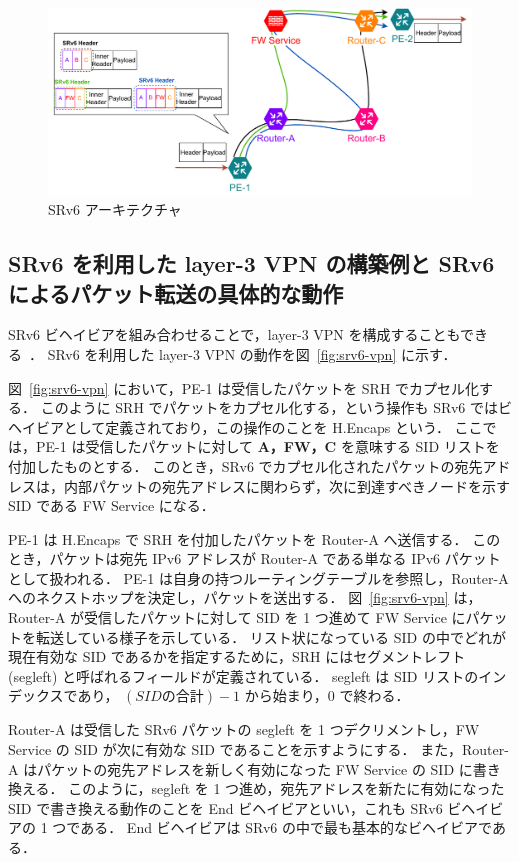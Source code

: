 \begin{figure}[t]
    \centering
    \includegraphics[width=0.95\linewidth]{img/SRv6Arch.pdf}
    \caption{SRv6 アーキテクチャ}
    \label{fig:srv6}
\end{figure}

\subsection{SRv6 を利用した layer-3 VPN の構築例と SRv6 によるパケット転送の具体的な動作}
\label{sbsection:srv6-vpn}

SRv6 ビヘイビアを組み合わせることで，layer-3 VPN を構成することもできる~\cite{rfc9252}．
SRv6 を利用した layer-3 VPN の動作を図~\ref*{fig:srv6-vpn} に示す．

図~\ref*{fig:srv6-vpn}  において，PE-1 は受信したパケットを SRH でカプセル化する．
このように SRH でパケットをカプセル化する，という操作も SRv6 ではビヘイビアとして定義されており，この操作のことを H.Encaps という．
ここでは，PE-1 は受信したパケットに対して \textbf{A，FW，C} を意味する SID リストを付加したものとする．
このとき，SRv6 でカプセル化されたパケットの宛先アドレスは，内部パケットの宛先アドレスに関わらず，次に到達すべきノードを示す SID である FW Service になる．

PE-1 は H.Encaps で SRH を付加したパケットを Router-A へ送信する．
このとき，パケットは宛先 IPv6 アドレスが Router-A である単なる IPv6 パケットとして扱われる．
PE-1 は自身の持つルーティングテーブルを参照し，Router-A へのネクストホップを決定し，パケットを送出する．
図~\ref*{fig:srv6-vpn}  は，Router-A が受信したパケットに対して SID を 1 つ進めて FW Service にパケットを転送している様子を示している．
リスト状になっている SID の中でどれが現在有効な SID であるかを指定するために，SRH にはセグメントレフト (segleft) と呼ばれるフィールドが定義されている．
segleft は SID リストのインデックスであり， $(SID の合計)-1$ から始まり，$0$ で終わる．

Router-A は受信した SRv6 パケットの segleft を 1 つデクリメントし，FW Service の SID が次に有効な SID であることを示すようにする．
また，Router-A はパケットの宛先アドレスを新しく有効になった FW Service の SID に書き換える．
このように，segleft を 1 つ進め，宛先アドレスを新たに有効になった SID で書き換える動作のことを End ビヘイビアといい，これも SRv6 ビヘイビアの 1 つである．
End ビヘイビアは SRv6 の中で最も基本的なビヘイビアである．

